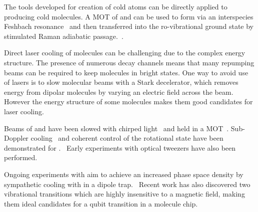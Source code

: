 The tools developed for creation of cold atoms can be directly applied to
producing cold molecules. A MOT of \esRb{} and \ottCs{} can be used to form
\RbCs{} via an interspecies Feshbach resonance~\cite{PhysRevA.85.032506,
PhysRevA.89.033604} and then transferred into the ro-vibrational ground state by
stimulated Raman adiabatic passage.~\cite{PhysRevLett.113.255301,
RevModPhys.70.1003}.

Direct laser cooling of molecules can be challenging due to the complex energy
structure. The presence of numerous decay channels means that many repumping
beams can be required to keep molecules in bright states. One way to avoid use
of lasers is to slow molecular beams with a Stark decelerator, which removes
energy from dipolar molecules by varying an electric field across the
beam.~\cite{Bethlem1999} However the energy structure of some molecules makes
them good candidates for laser cooling.~\cite{Shuman2010,}

 Beams of \SrF{} and \CaF{} have
been slowed with chirped light~\cite{PhysRevLett.108.103002, Truppe2017a} and
held in a MOT~\cite{Barry2014, Williams2017}. Sub-Doppler
cooling~\cite{Truppe2017} and coherent control of the rotational state have been
demonstrated for \CaF{}.~\cite{Williams2018, Blackmore_2018}  Early experiments with optical tweezers have also been
performed.~\cite{Anderegg2019}


Ongoing experiments with \CaF{} aim to achieve an increased phase space density by
sympathetic cooling with \esRb{} in a dipole trap.~ Recent
work has also discovered two vibrational transitions which are highly
insensitive to a magnetic field, making them ideal candidates for a qubit
transition in a molecule chip.
